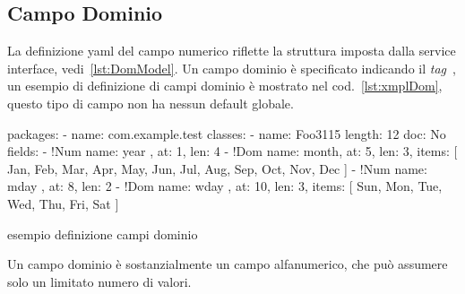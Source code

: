 \documentclass[a4paper,10pt]{report}
\newif\ifesource
\newenvironment{elisting}[1][H]
  {\captionsetup{aboveskip=0pt}\begin{listing}[#1]}
  {\end{listing}%
}
\begin{document}
\subsection{Campo Dominio} \label{sub:yaml.dom}
La definizione yaml del campo numerico riflette la struttura imposta dalla
service interface, vedi~\ref{lst:DomModel}.
Un campo dominio è specificato indicando il \textsl{tag} 
\,, 
un esempio di definizione di campi dominio è mostrato nel 
cod.~\ref{lst:xmplDom}, questo tipo di campo non ha nessun default globale.


\ifesource
\begin{figure*}[!htb]
\begin{lstlisting}[language=yaml, caption={esempio definizione campi dominio}, 
label=lst:xmplDom]
packages:
  - name: com.example.test
    classes:
      - name: Foo3115
        length: 12
        doc: No
        fields:
          - !Num { name: year , at: 1, len: 4 }
          - !Dom { name: month, at: 5, len: 3, 
                   items: [ Jan, Feb, Mar, Apr, May, Jun, Jul, Aug, Sep, Oct, Nov, Dec ] }
          - !Num { name: mday , at: 8, len: 2 }
          - !Dom { name: wday , at: 10, len: 3, 
                   items: [ Sun, Mon, Tue, Wed, Thu, Fri, Sat ] }
\end{lstlisting}
\end{figure*}
\else
\begin{elisting}[!htb]
\begin{yamlcode}
packages:
  - name: com.example.test
    classes:
      - name: Foo3115
        length: 12
        doc: No
        fields:
          - !Num { name: year , at: 1, len: 4 }
          - !Dom { name: month, at: 5, len: 3, 
                   items: [ Jan, Feb, Mar, Apr, May, Jun, Jul, Aug, Sep, Oct, Nov, Dec ] }
          - !Num { name: mday , at: 8, len: 2 }
          - !Dom { name: wday , at: 10, len: 3, 
                   items: [ Sun, Mon, Tue, Wed, Thu, Fri, Sat ] }
\end{yamlcode}
\caption{esempio definizione campi dominio}
\label{lst:xmplDom}
\end{elisting}
\fi

Un campo dominio è sostanzialmente un campo alfanumerico, che può assumere solo
un limitato numero di valori.
\end{document}
